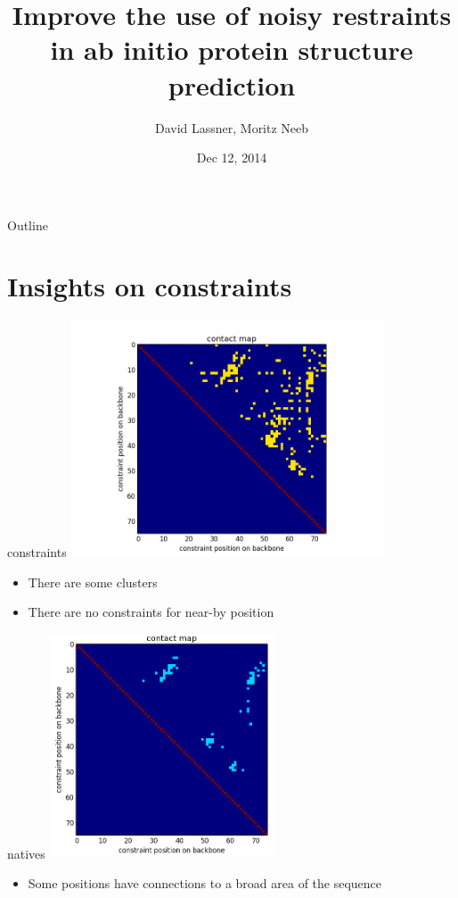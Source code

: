 \documentclass{beamer}
\title[Restraint Selection in PSP] %
{Improve the use of noisy restraints in ab initio protein structure prediction}
\author%
{David Lassner, Moritz Neeb}
\institute[Universities of Somewhere and Elsewhere] %
{
  Computational Biology Project\\
  TU Berlin}
\date%
{Dec 12, 2014}
\begin{document}
\begin{frame}
  \titlepage
\end{frame}

\begin{frame}{Outline}
  \tableofcontents
\end{frame}

\section{Insights on constraints}
\begin{frame}{constraints}
    \centering
    \includegraphics[width=0.7\textwidth]{img/contactMap}
    \begin{itemize}
    \item There are some clusters
    \item There are no constraints for near-by position
    \end{itemize}
\end{frame}


\begin{frame}{natives}
    \centering
    \includegraphics[width=0.5\textwidth]{img/contactMapNatives}
    \begin{itemize}
    \item Some positions have connections to a broad area of the sequence
    \end{itemize}
\end{frame}
\end{document}
